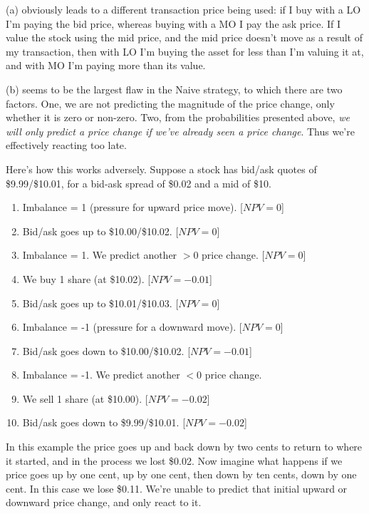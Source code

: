 (a) obviously leads to a different transaction price being used: if I buy with a LO I'm paying the bid price, whereas buying with a MO I pay the ask price. If I value the stock using the mid price, and the mid price doesn't move as a result of my transaction, then with LO I'm buying the asset for less than I'm valuing it at, and with MO I'm paying more than its value.

(b) seems to be the largest flaw in the Naive strategy, to which there are two factors. One, we are not predicting the magnitude of the price change, only whether it is zero or non-zero. Two, from the probabilities presented above, \textit{we will only predict a price change if we've already seen a price change}. Thus we're effectively reacting too late. 

Here's how this works adversely. Suppose a stock has bid/ask quotes of \$9.99/\$10.01, for a bid-ask spread of \$0.02 and a mid of \$10.

\begin{enumerate}
\item Imbalance = 1 (pressure for upward price move). [$NPV = 0$]
\item Bid/ask goes up to \$10.00/\$10.02. [$NPV = 0$]
\item Imbalance = 1. We predict another $>0$ price change. [$NPV = 0$]
\item We buy 1 share (at \$10.02). [$NPV = -0.01$]
\item Bid/ask goes up to \$10.01/\$10.03. [$NPV = 0$]
\item Imbalance = -1 (pressure for a downward move). [$NPV = 0$]
\item Bid/ask goes down to \$10.00/\$10.02. [$NPV = -0.01$]
\item Imbalance = -1. We predict another $<0$ price change. 
\item We sell 1 share (at \$10.00). [$NPV = -0.02$]
\item Bid/ask goes down to \$9.99/\$10.01. [$NPV = -0.02$]
\end{enumerate}

In this example the price goes up and back down by two cents to return to where it started, and in the process we lost \$0.02. Now imagine what happens if we price goes up by one cent, up by one cent, then down by ten cents, down by one cent. In this case we lose \$0.11. We're unable to predict that initial upward or downward price change, and only react to it. 

